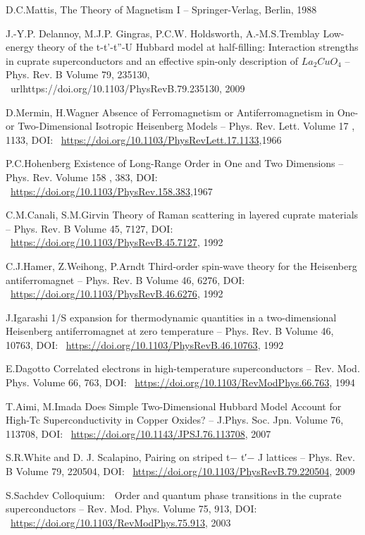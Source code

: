 \documentclass[11pt]{article}
\begin{document}
\begin{thebibliography}{3}
D.C.Mattis, The Theory of Magnetism I -- Springer-Verlag, Berlin, 1988

J.-Y.P. Delannoy, M.J.P. Gingras, P.C.W. Holdsworth, A.-M.S.Tremblay Low-energy theory of the t-t'-t''-U Hubbard model at half-filling: Interaction strengths in cuprate superconductors and an effective spin-only description of $La_2CuO_4$ -- Phys. Rev. B Volume 79, 235130, ~url{https://doi.org/10.1103/PhysRevB.79.235130}, 2009

D.Mermin, H.Wagner Absence of Ferromagnetism or Antiferromagnetism in One- or Two-Dimensional Isotropic Heisenberg Models -- Phys. Rev. Lett. Volume 17 , 1133, DOI: ~\url{https://doi.org/10.1103/PhysRevLett.17.1133},1966

P.C.Hohenberg Existence of Long-Range Order in One and Two Dimensions -- Phys. Rev. Volume 158 , 383, DOI: ~\url{https://doi.org/10.1103/PhysRev.158.383},1967

C.M.Canali, S.M.Girvin Theory of Raman scattering in layered cuprate materials -- Phys. Rev. B Volume 45, 7127, DOI: ~\url{https://doi.org/10.1103/PhysRevB.45.7127}, 1992

C.J.Hamer, Z.Weihong, P.Arndt Third-order spin-wave theory for the Heisenberg antiferromagnet -- Phys. Rev. B Volume 46, 6276, DOI: ~\url{https://doi.org/10.1103/PhysRevB.46.6276}, 1992

J.Igarashi 1/S expansion for thermodynamic quantities in a two-dimensional Heisenberg antiferromagnet at zero temperature -- Phys. Rev. B Volume 46, 10763, DOI: ~\url{https://doi.org/10.1103/PhysRevB.46.10763}, 1992

E.Dagotto Correlated electrons in high-temperature superconductors -- Rev. Mod. Phys. Volume 66, 763, DOI: ~\url{https://doi.org/10.1103/RevModPhys.66.763}, 1994

T.Aimi, M.Imada Does Simple Two-Dimensional Hubbard Model Account for High-Tc Superconductivity in Copper Oxides? -- J.Phys. Soc. Jpn. Volume 76, 113708, DOI: ~\url{https://doi.org/10.1143/JPSJ.76.113708}, 2007

S.R.White and D. J. Scalapino, Pairing on striped t− t′− J lattices -- Phys. Rev. B Volume 79, 220504, DOI: ~\url{https://doi.org/10.1103/PhysRevB.79.220504}, 2009

S.Sachdev Colloquium: Order and quantum phase transitions in the cuprate superconductors -- Rev. Mod. Phys. Volume 75, 913, DOI: ~\url{https://doi.org/10.1103/RevModPhys.75.913}, 2003


\end{thebibliography}
\end{document}
